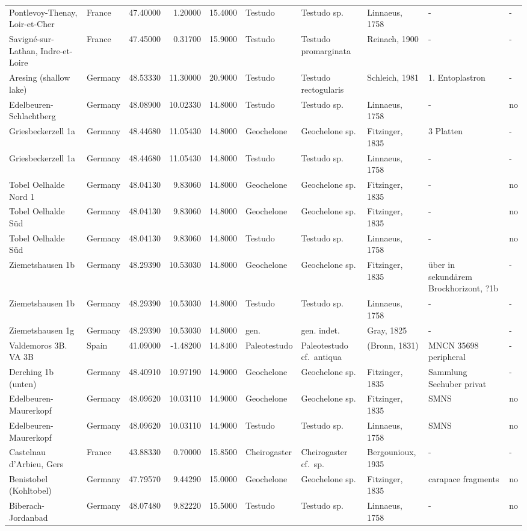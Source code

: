 \begin{landscape}
{\begin{longtable}[]{@{}llrrrlllll@{}}
Pontlevoy-Thenay, Loir-et-Cher & France & 47.40000 & 1.20000 & 15.4000 &
Testudo & Testudo sp. & Linnaeus, 1758 & - & -\tabularnewline
Savigné-sur-Lathan, Indre-et-Loire & France & 47.45000 & 0.31700 &
15.9000 & Testudo & Testudo promarginata & Reinach, 1900 & - &
-\tabularnewline
Aresing (shallow lake) & Germany & 48.53330 & 11.30000 & 20.9000 &
Testudo & Testudo rectogularis & Schleich, 1981 & 1. Entoplastron &
-\tabularnewline
Edelbeuren-Schlachtberg & Germany & 48.08900 & 10.02330 & 14.8000 &
Testudo & Testudo sp. & Linnaeus, 1758 & - & no\tabularnewline
Griesbeckerzell 1a & Germany & 48.44680 & 11.05430 & 14.8000 &
Geochelone & Geochelone sp. & Fitzinger, 1835 & 3 Platten &
-\tabularnewline
Griesbeckerzell 1a & Germany & 48.44680 & 11.05430 & 14.8000 & Testudo &
Testudo sp. & Linnaeus, 1758 & - & -\tabularnewline
Tobel Oelhalde Nord 1 & Germany & 48.04130 & 9.83060 & 14.8000 &
Geochelone & Geochelone sp. & Fitzinger, 1835 & - & no\tabularnewline
Tobel Oelhalde Süd & Germany & 48.04130 & 9.83060 & 14.8000 & Geochelone
& Geochelone sp. & Fitzinger, 1835 & - & no\tabularnewline
Tobel Oelhalde Süd & Germany & 48.04130 & 9.83060 & 14.8000 & Testudo &
Testudo sp. & Linnaeus, 1758 & - & no\tabularnewline
Ziemetshausen 1b & Germany & 48.29390 & 10.53030 & 14.8000 & Geochelone
& Geochelone sp. & Fitzinger, 1835 & über in sekundärem Brockhorizont,
?1b & -\tabularnewline
Ziemetshausen 1b & Germany & 48.29390 & 10.53030 & 14.8000 & Testudo &
Testudo sp. & Linnaeus, 1758 & - & -\tabularnewline
Ziemetshausen 1g & Germany & 48.29390 & 10.53030 & 14.8000 & gen. & gen.
indet. & Gray, 1825 & - & -\tabularnewline
Valdemoros 3B. VA 3B & Spain & 41.09000 & -1.48200 & 14.8400 &
Paleotestudo & Paleotestudo cf.~antiqua & (Bronn, 1831) & MNCN 35698
peripheral & -\tabularnewline
Derching 1b (unten) & Germany & 48.40910 & 10.97190 & 14.9000 &
Geochelone & Geochelone sp. & Fitzinger, 1835 & Sammlung Seehuber privat
& -\tabularnewline
Edelbeuren-Maurerkopf & Germany & 48.09620 & 10.03110 & 14.9000 &
Geochelone & Geochelone sp. & Fitzinger, 1835 & SMNS & no\tabularnewline
Edelbeuren-Maurerkopf & Germany & 48.09620 & 10.03110 & 14.9000 &
Testudo & Testudo sp. & Linnaeus, 1758 & SMNS & no\tabularnewline
Castelnau d'Arbieu, Gers & France & 43.88330 & 0.70000 & 15.8500 &
Cheirogaster & Cheirogaster cf.~sp. & Bergounioux, 1935 & - &
-\tabularnewline
Benistobel (Kohltobel) & Germany & 47.79570 & 9.44290 & 15.0000 &
Geochelone & Geochelone sp. & Fitzinger, 1835 & carapace fragments &
no\tabularnewline
Biberach-Jordanbad & Germany & 48.07480 & 9.82220 & 15.5000 & Testudo &
Testudo sp. & Linnaeus, 1758 & - & no\tabularnewline

\end{longtable}}
\end{landscape}
